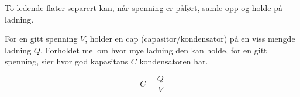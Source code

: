 To ledende flater separert kan, når spenning er påført, samle opp
og holde på ladning.

For en gitt spenning $V$, holder en cap (capasitor/kondensator) på
en viss mengde ladning $Q$.
Forholdet mellom hvor mye ladning den kan holde, for en gitt spenning,
sier hvor god kapasitans $C$ kondensatoren har.

$$C = \frac{Q}{V}$$
